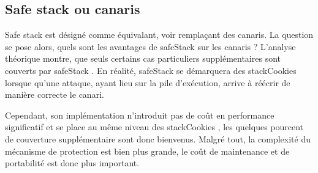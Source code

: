 \vfill

\subsection{\og Safe stack \fg ou canaris}

\og Safe stack \fg est désigné comme équivalant, voir remplaçant des canaris. La question se pose alors, quels sont les avantages de \og \gls{safeStack} \fg sur les canaris ? L'analyse théorique montre, que seuls certains cas particuliers supplémentaires sont couverts par \og \gls{safeStack} \fg.
En réalité, \og \gls{safeStack} \fg se démarquera des \og \gls{stackCookies} \fg lorsque qu'une attaque, ayant lieu sur la pile d'exécution, arrive à réécrir de manière correcte le canari.

Cependant, son implémentation n'introduit pas de coût en performance significatif et se place au même niveau des \og \gls{stackCookies} \fg, les quelques pourcent de couverture supplémentaire sont donc bienvenus. Malgré tout, la complexité du mécanisme de protection est bien plus grande, le \og coût \fg de maintenance et de portabilité est donc plus important.
